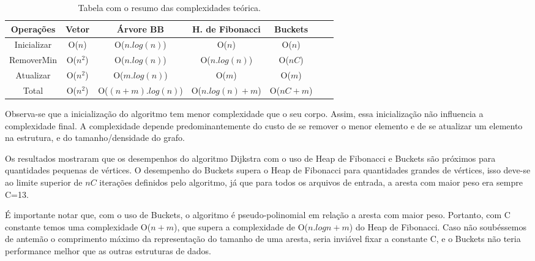 \documentclass[
	12pt,				%
	oneside,			%
	a4paper,			%
	english,			%
	french,				%
	spanish,			%
	brazil,				%
	]{abntex2}
\begin{document}
\begin{table}[ht!]
\centering    
    \begin{tabular}{|c|c|c|c|c|c|c|}
    \hline
    \multicolumn{1}{|c|}{\cellcolor{gray!10} Operações} & \multicolumn{1}{|c|}{\cellcolor{gray!10}Vetor} & \multicolumn{1}{|c|}{\cellcolor{gray!10}Árvore BB} & \multicolumn{1}{|c|}{\cellcolor{gray!10}H. de Fibonacci} & \multicolumn{1}{|c|}{\cellcolor{gray!10}Buckets}\\ %
    \hline
    Inicializar & O($n$) & O($n.log(n)$) & O($n$) & O($n$) %
    \\
    \hline
    RemoverMin & O($n^2$) & O($n.log(n)$) & O($n.log(n)$) & O($nC$) %
    \\
    \hline
    Atualizar & O($n^2$) & O($m.log(n)$) & O($m$) & O($m$) %
    \\
    \hline
    Total & O($n^2$) & O($(n+m).log(n)$) & O($n.log(n)+m$) & O($nC + m$) %
    \\    
    \hline
    \end{tabular}
    \caption{Tabela com o resumo das complexidades teórica.}  
    \label{tab:complex}
\end{table}

Observa-se que a inicialização do algoritmo tem menor complexidade que o seu corpo. Assim, essa inicialização não influencia a complexidade final. A complexidade depende predominantemente do custo de se remover o menor elemento e de se atualizar um elemento na estrutura, e do tamanho/densidade do grafo.

Os resultados mostraram que os desempenhos do algoritmo Dijkstra com o uso de Heap de Fibonacci e Buckets são próximos para quantidades pequenas de vértices. O desempenho do Buckets supera o Heap de Fibonacci para quantidades grandes de vértices, isso deve-se ao limite superior de $nC$ iterações definidos pelo algoritmo, já que para todos os arquivos de entrada, a aresta com maior peso era sempre C=13.

É importante notar que, com o uso de Buckets, o algoritmo é pseudo-polinomial em relação a aresta com maior peso. Portanto, com C constante temos uma complexidade O($n+m$), que supera a complexidade de O($n.logn + m$) do Heap de Fibonacci. Caso não soubéssemos de antemão o comprimento máximo da representação do tamanho de uma aresta, seria inviável fixar a constante C, e o Buckets não teria performance melhor que as outras estruturas de dados.
\end{document}
